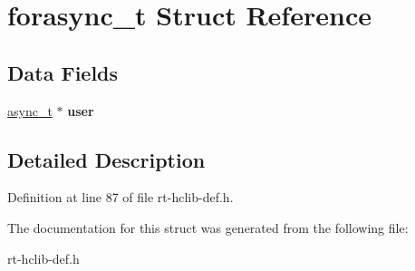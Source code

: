 \hypertarget{structforasync__t}{\section{forasync\-\_\-t Struct Reference}
\label{structforasync__t}
}
\subsection*{Data Fields}
\begin{DoxyCompactItemize}
\item 
\hypertarget{structforasync__t_aac1b4964c25c5b50d20559fd9c458340}{\hyperlink{structasync__t}{async\-\_\-t} $\ast$ {\bfseries user}}\label{structforasync__t_aac1b4964c25c5b50d20559fd9c458340}

\end{DoxyCompactItemize}


\subsection{Detailed Description}


Definition at line 87 of file rt-\/hclib-\/def.\-h.



The documentation for this struct was generated from the following file\-:\begin{DoxyCompactItemize}
\item 
rt-\/hclib-\/def.\-h\end{DoxyCompactItemize}
